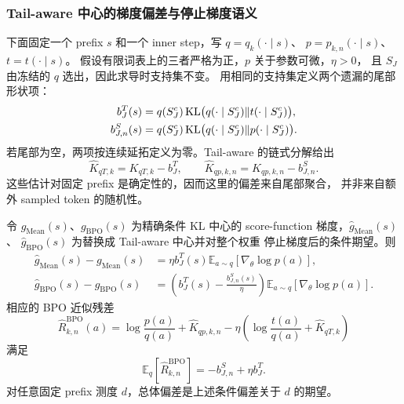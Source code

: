 \subsubsection*{Tail-aware 中心的梯度偏差与停止梯度语义}

下面固定一个 prefix $s$ 和一个 inner step，写 $q=q_k(\cdot\mid s)$、 $p=p_{k,n}(\cdot\mid s)$、$t=t(\cdot\mid s)$。 假设有限词表上的三者严格为正，$p$ 关于参数可微，$\eta>0$， 且 $S_J$ 由冻结的 $q$ 选出，因此求导时支持集不变。 用相同的支持集定义两个遗漏的尾部形状项：
\begin{align}
 b_J^T(s)&=q(S_J^c)\operatorname{KL}\bigl(q(\cdot\mid S_J^c)\Vert t(\cdot\mid S_J^c)\bigr),\\
 b_{J,n}^S(s)&=q(S_J^c)\operatorname{KL}\bigl(q(\cdot\mid S_J^c)\Vert p(\cdot\mid S_J^c)\bigr).
\end{align}
若尾部为空，两项按连续延拓定义为零。Tail-aware 的链式分解给出
\begin{equation}
 \widehat K_{qT,k}=K_{qT,k}-b_J^T,
 \qquad
 \widehat K_{qp,k,n}=K_{qp,k,n}-b_{J,n}^S.
\end{equation}
这些估计对固定 prefix 是确定性的，因而这里的偏差来自尾部聚合， 并非来自额外 sampled token 的随机性。

\begin{theorem}
\label{thm:ch2-ta-center-gradient-bias}
令 $g_{\mathrm{Mean}}(s)$、$g_{\mathrm{BPO}}(s)$ 为精确条件 KL 中心的 score-function 梯度，$\widehat g_{\mathrm{Mean}}(s)$、 $\widehat g_{\mathrm{BPO}}(s)$ 为替换成 Tail-aware 中心并对整个权重 停止梯度后的条件期望。则
\begin{align}
 \widehat g_{\mathrm{Mean}}(s)-g_{\mathrm{Mean}}(s)
 &=\eta b_J^T(s)\mathbb E_{a\sim q}[\nabla_\theta\log p(a)],\\
 \widehat g_{\mathrm{BPO}}(s)-g_{\mathrm{BPO}}(s)
 &=\left(b_J^T(s)-\frac{b_{J,n}^S(s)}{\eta}\right)
   \mathbb E_{a\sim q}[\nabla_\theta\log p(a)].
\end{align}
相应的 BPO 近似残差
\begin{equation}
 \widehat R_{k,n}^{\mathrm{BPO}}(a)
 =\log\frac{p(a)}{q(a)}+\widehat K_{qp,k,n}
 -\eta\left(\log\frac{t(a)}{q(a)}+\widehat K_{qT,k}\right)
\end{equation}
满足
\begin{equation}
 \mathbb E_q[\widehat R_{k,n}^{\mathrm{BPO}}]=-b_{J,n}^S+\eta b_J^T.
\end{equation}
对任意固定 prefix 测度 $d$，总体偏差是上述条件偏差关于 $d$ 的期望。
\end{theorem}

